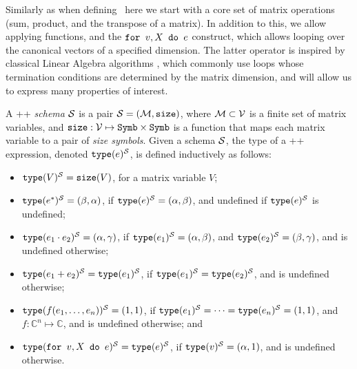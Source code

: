 Similarly as when defining \lang\, here we start with a core set of matrix operations (sum, product, and the transpose of a matrix). In addition to this, we allow applying functions, and  the $\texttt{for }v,X \texttt{ do }e$ construct, which allows looping over the canonical vectors of a specified dimension. The latter operator is inspired by classical Linear Algebra algorithms \cite{num}, which commonly use loops whose termination conditions are determined by the matrix dimension, and will allow us to express many properties of interest.

A \lang++ {\em schema} $\mathcal{S}$ is a pair $\mathcal{S}=(\mathcal{M},\texttt{size})$, where $\mathcal{M}\subset \mathcal{V}$ is a finite set of matrix variables, and $\texttt{size}: \mathcal{V} \mapsto \texttt{Symb}\times \texttt{Symb}$ is a function that maps each matrix variable to a pair of {\em size symbols}. Given a schema $\mathcal{S}$, the type of a \lang++ expression, denoted $\texttt{type}(e)^{\mathcal{S}}$, is defined inductively as follows:
\begin{itemize}
\item $\texttt{type}(V)^{\mathcal{S}} = \texttt{size}(V)$, for a matrix variable $V$;
\item $\texttt{type}(e^*)^{\mathcal{S}} = (\beta,\alpha)$, if $\texttt{type}(e)^{\mathcal{S}}=(\alpha,\beta)$, and undefined if $\texttt{type}(e)^{\mathcal{S}}$ is undefined;
\item $\texttt{type}(e_1 \cdot e_2)^{\mathcal{S}} = (\alpha,\gamma)$, if $\texttt{type}(e_1)^{\mathcal{S}}=(\alpha,\beta)$, and $\texttt{type}(e_2)^{\mathcal{S}}=(\beta,\gamma)$, and is undefined otherwise;
\item $\texttt{type}(e_1 + e_2)^{\mathcal{S}} = \texttt{type}(e_1)^{\mathcal{S}}$, if $\texttt{type}(e_1)^{\mathcal{S}} = \texttt{type}(e_2)^{\mathcal{S}}$, and is undefined otherwise;
\item $\texttt{type}(f(e_1,\ldots ,e_n))^{\mathcal{S}} = (1,1)$, if $\texttt{type}(e_1)^{\mathcal{S}}= \cdots =\texttt{type}(e_n)^{\mathcal{S}}=(1,1)$, and $f:\mathbb{C}^n\mapsto \mathbb{C}$, and is undefined otherwise; and
\item $\texttt{type}(\texttt{for }v,X \texttt{ do }e)^{\mathcal{S}} = \texttt{type}(e)^{\mathcal{S}}$, if $\texttt{type}(v)^{\mathcal{S}} = (\alpha,1)$, and is undefined otherwise.
\end{itemize}

